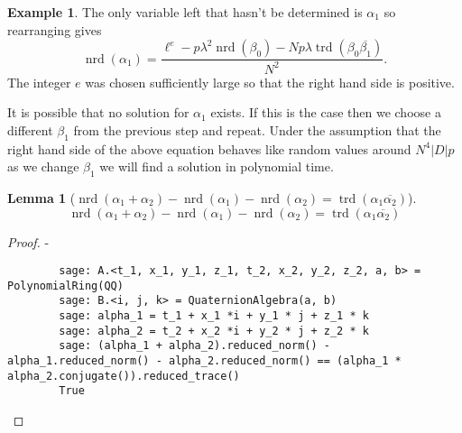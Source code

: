 \documentclass[10pt]{article}
\theoremstyle{plain}
\newtheorem{lemma}[theorem]{Lemma}
\theoremstyle{definition}
\newtheorem{example}[theorem]{Example}
\newcommand{\op}{\operatorname}
\newcommand{\nrd}{\op{nrd}}
\newcommand{\trd}{\op{trd}}
\begin{document}
\begin{example}
    The only variable left that hasn't be determined is \( \alpha_1 \) so rearranging gives
    \[
        \nrd(\alpha_1) = \frac{\ell^e - p\lambda^2 \nrd(\beta_0) - Np\lambda \trd(\beta_0\overline{\beta_1})}{N^2}.
    \]
    The integer \( e \) was chosen sufficiently large so that the right hand side is positive.

    It is possible that no solution for \( \alpha_1 \) exists.
    If this is the case then we choose a different \( \beta_1 \) from the previous step and repeat.
    Under the assumption that the right hand side of the above equation behaves like random values around \( N^4|D|p \) as we change \( \beta_1 \) we will find a solution in polynomial time.
\end{example}

\begin{lemma}[\( \nrd(\alpha_1 + \alpha_2) - \nrd(\alpha_1) - \nrd(\alpha_2) = \trd(\alpha_1 \overline{\alpha_2}) \)]
    \[
        \nrd(\alpha_1 + \alpha_2) - \nrd(\alpha_1) - \nrd(\alpha_2) = \trd(\alpha_1 \overline{\alpha_2})
    \]
\end{lemma}
\begin{proof}
    -
    \begin{lstlisting}
        sage: A.<t_1, x_1, y_1, z_1, t_2, x_2, y_2, z_2, a, b> = PolynomialRing(QQ)
        sage: B.<i, j, k> = QuaternionAlgebra(a, b)
        sage: alpha_1 = t_1 + x_1 *i + y_1 * j + z_1 * k
        sage: alpha_2 = t_2 + x_2 *i + y_2 * j + z_2 * k
        sage: (alpha_1 + alpha_2).reduced_norm() - alpha_1.reduced_norm() - alpha_2.reduced_norm() == (alpha_1 * alpha_2.conjugate()).reduced_trace()
        True
    \end{lstlisting}
\end{proof}
\end{document}
